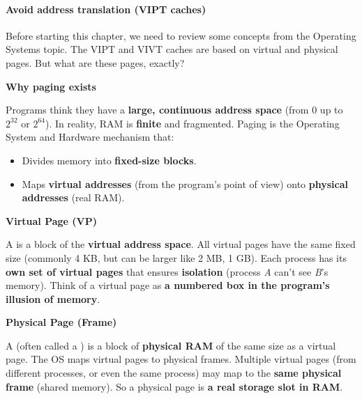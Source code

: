 \paragraph{Avoid address translation (VIPT caches)}\label{paragraph: Avoid address translation - VIPT}

\begin{remarkbox}\label{remarkbox: VA and PP}
    Before starting this chapter, we need to review some concepts from the Operating Systems topic. The VIPT and VIVT caches are based on virtual and physical pages. But what are these pages, exactly?

    \highspace
    \begin{flushleft}
        \textcolor{Green3}{ \textbf{Why paging exists}}
    \end{flushleft}
    Programs think they have a \textbf{large, continuous address space} (from 0 up to $2^{32}$ or $2^{64}$). In reality, RAM is \textbf{finite} and fragmented. Paging is the Operating System and Hardware mechanism that:
    \begin{itemize}
        \item Divides memory into \textbf{fixed-size blocks}.
        \item Maps \textbf{virtual addresses} (from the program's point of view) onto \textbf{physical addresses} (real RAM).
    \end{itemize}

    \highspace
    \begin{flushleft}
        \textcolor{Green3}{ \textbf{Virtual Page (VP)}}
    \end{flushleft}
    A  is a block of the \textbf{virtual address space}. All virtual pages have the same fixed size (commonly 4 KB, but can be larger like 2 MB, 1 GB). Each process has its \textbf{own set of virtual pages} that ensures \textbf{isolation} (process \emph{A} can't see \emph{B}'s memory). Think of a virtual page as \textbf{a numbered box in the program's illusion of memory}.

    \highspace
    \begin{flushleft}
        \textcolor{Green3}{ \textbf{Physical Page (Frame)}}
    \end{flushleft}
    A  (often called a ) is a block of \textbf{physical RAM} of the same size as a virtual page. The OS maps virtual pages to physical frames. Multiple virtual pages (from different processes, or even the same process) may map to the \textbf{same physical frame} (shared memory). So a physical page is \textbf{a real storage slot in RAM}.


\end{remarkbox}
